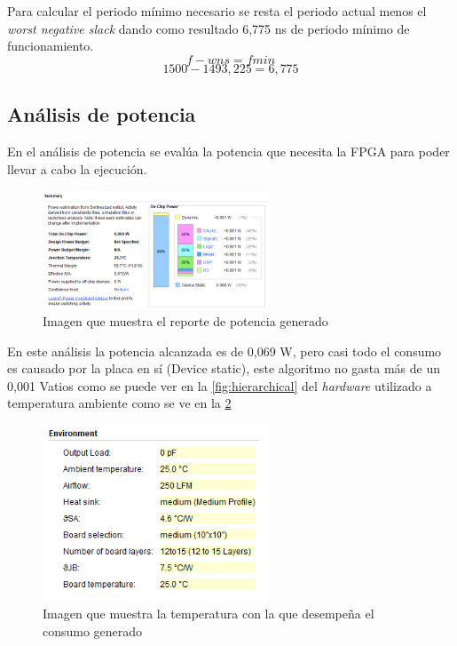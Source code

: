 	Para calcular el periodo mínimo necesario se resta el periodo actual menos el \textit{worst negative slack} dando como resultado 6,775 ns de periodo mínimo de funcionamiento.  
	\[f - wns = f{min}\]
	\[1500 - 1493,225 = 6,775\]

	

\subsection{Análisis de potencia}

	En el análisis de potencia se evalúa la potencia que necesita la FPGA para poder llevar a cabo la ejecución.

	\begin{figure}[h!]
		\centering
		\includegraphics[width=0.6\textwidth]{./Images/img_res_experimentales/reportepower.png}
		\caption{Imagen que muestra el reporte de potencia generado}
		\label{fig:reportepotencia}
	\end{figure} 

	En este análisis la potencia alcanzada es de 0,069 W, pero casi todo el consumo es causado por la placa en sí (Device static), este algoritmo no gasta más de un 0,001 Vatios como se puede ver en la \cref*{fig:hierarchical} del \textit{hardware} utilizado a temperatura ambiente como se ve en la \cref*{fig:temperaturaambiente}

	\begin{figure}[h!]
		\centering
		\includegraphics[width=0.6\textwidth]{./Images/img_res_experimentales/temperaturaambientereportepower.png}
		\caption{Imagen que muestra la temperatura con la que desempeña el consumo generado}
		\label{fig:temperaturaambiente}
	\end{figure} 

